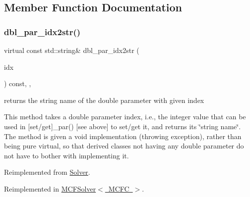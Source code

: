 \subsection{Member Function Documentation}
\mbox{\label{class_s_m_spp__di__unipi__it_1_1_c_d_a_solver_a93f1297e7910e91cc18b303376191026}} 
\subsubsection{\texorpdfstring{dbl\+\_\+par\+\_\+idx2str()}{dbl\_par\_idx2str()}}
{\footnotesize\ttfamily virtual const std\+::string\& dbl\+\_\+par\+\_\+idx2str (\begin{DoxyParamCaption}\item[{const \mbox{\hyperlink{class_s_m_spp__di__unipi__it_1_1_thin_compute_interface_aa3d710629ad8c434286726ad810c3b47}{idx\+\_\+type}}}]{idx }\end{DoxyParamCaption}) const\hspace{0.3cm}{\ttfamily [inline]}, {\ttfamily [override]}, {\ttfamily [virtual]}}



returns the string name of the double parameter with given index 

This method takes a double parameter index, i.\+e., the integer value that can be used in \mbox{[}set/get\mbox{]}\+\_\+par() \mbox{[}see above\mbox{]} to set/get it, and returns its \char`\"{}string name\char`\"{}. The method is given a void implementation (throwing exception), rather than being pure virtual, so that derived classes not having any double parameter do not have to bother with implementing it. 

Reimplemented from \mbox{\hyperlink{class_s_m_spp__di__unipi__it_1_1_solver_a93f1297e7910e91cc18b303376191026}{Solver}}.



Reimplemented in \mbox{\hyperlink{class_s_m_spp__di__unipi__it_1_1_m_c_f_solver_a93f1297e7910e91cc18b303376191026}{M\+C\+F\+Solver$<$ M\+C\+F\+C $>$}}.

\mbox{\label{class_s_m_spp__di__unipi__it_1_1_c_d_a_solver_a6d353ac3d1200d9bea89235da61bc4f3}} 
